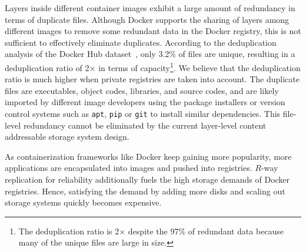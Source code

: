 Layers inside different container images exhibit a large amount of redundancy
in terms of duplicate files.
%
Although Docker
supports the sharing of layers among different images to remove some redundant data in the
Docker registry,
this is not sufficient to effectively eliminate duplicates.
%
According to the deduplication analysis of the Docker Hub
dataset~\cite{dedupanalysis}, only 3.2\% of files are unique, resulting in
a deduplication ratio of 2$\times$ in terms of
capacity\footnote{The deduplication ratio is 2$\times$ despite the 97\% of redundant data
because many of the unique files are large in size.}.
%
We believe that the deduplication ratio is much higher when
private registries are taken into account.
%
The duplicate files
are executables, object codes, libraries, and
source codes, and are likely imported by different image developers using the
package installers or version control systems such as \texttt{apt},
\texttt{pip} or \texttt{git} to install similar dependencies.
%
This file-level redundancy cannot be eliminated by the current layer-level content addressable
storage system design.

As containerization frameworks like Docker keep gaining more
popularity, more applications are encapsulated into images and pushed into
registries.
%
$R$-way replication for reliability additionally fuels the high storage demands
of Docker registries.
%
Hence, satisfying the demand by adding more disks and scaling out storage systems
quickly becomes expensive.
 
